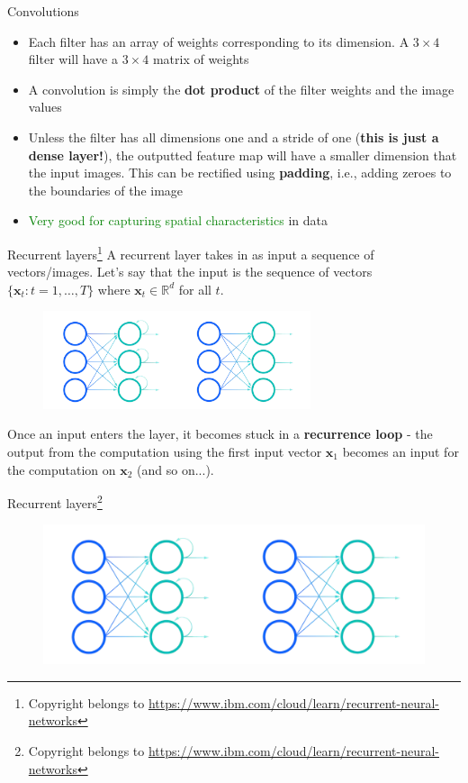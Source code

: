 \documentclass{beamer}
\begin{document}
\begin{frame}{Convolutions}
\begin{itemize}
\item Each filter has an array of weights corresponding to its dimension. A $3\times 4$ filter will have a $3\times 4$ matrix of weights
\item A convolution is simply the \textbf{dot product} of the filter weights and the image values
\item Unless the filter has all dimensions one and a stride of one (\textbf{this is just a dense layer!}), the outputted feature map will have a smaller dimension that the input images. This can be rectified using \textbf{padding}, i.e., adding zeroes to the boundaries of the image
\item \textcolor{green}{Very good for capturing spatial characteristics} in data
\end{itemize}
\end{frame}
\begin{frame}

\end{frame}
\begin{frame}{Recurrent layers\footnote{Copyright belongs to \url{https://www.ibm.com/cloud/learn/recurrent-neural-networks}}}
A recurrent layer takes in as input a sequence of vectors/images. Let's say that the input is the sequence of vectors $\{\mathbf{x}_t:t=1,\dots,T\}$ where $\mathbf{x}_t\in\mathbb{R}^d$ for all $t$.

\begin{figure}
\centering
\includegraphics[width=0.7\textwidth]{Images/rnn.png}
\end{figure}
Once an input enters the layer, it becomes stuck in a \textbf{recurrence loop} - the output from the computation using the first input vector $\mathbf{x}_1$ becomes an input for the computation on $\mathbf{x}_2$ (and so on...).
\end{frame}
\begin{frame}{Recurrent layers\footnote{Copyright belongs to \url{https://www.ibm.com/cloud/learn/recurrent-neural-networks}}}
\begin{figure}
\centering
\includegraphics[width=\textwidth]{Images/rnn.png}
\end{figure}

\end{frame}
\end{document}
